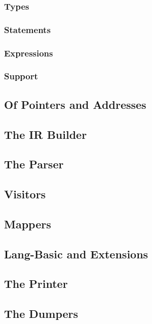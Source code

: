 \subsubsection{Types}
\subsubsection{Statements}
\subsubsection{Expressions}
\subsubsection{Support}

\subsection{Of Pointers and Addresses}
\label{sec:Compiler.Core.PointersAndAddresses}

\subsection{The IR Builder}
\label{sec:Compiler.Core.Builder}
\subsection{The Parser}
\label{sec:Compiler.Core.Parser}
\subsection{Visitors}
\label{sec:Compiler.Core.Visitors}
\subsection{Mappers}
\label{sec:Compiler.Core.Mappers}
\subsection{Lang-Basic and Extensions}
\label{sec:Compiler.Core.LangBasic}
\subsection{The Printer}
\label{sec:Compiler.Core.Printer}
\subsection{The Dumpers}
\label{sec:Compiler.Core.Dumpers}
